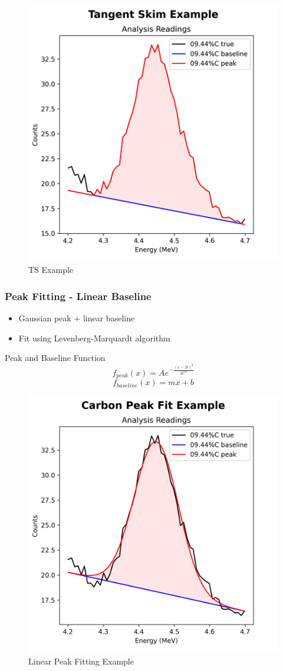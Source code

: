 \documentclass[xcolor=dvipsnames,envcountsect]{beamer}
\begin{document}
\begin{frame}
\begin{figure}
\begin{minipage}[b]{0.3\linewidth}
          \includegraphics[width=\linewidth]{Figures/tangentskimexample.png}
          \caption{TS Example}
          \label{fig:tangentskimexample}
      \end{minipage}
  \end{figure}
\end{frame}

\begin{frame}
  \frametitle{Peak Fitting - Linear Baseline}
  \begin{itemize}
    \item Gaussian peak + linear baseline
    \item Fit using Levenberg-Marquardt algorithm
  \end{itemize}
  \begin{block}{Peak and Baseline Function}
    \begin{equation}
      f_{peak}(x) = A e^{-\frac{(x - B)^2}{2C^2}}
    \end{equation}
    \begin{equation}
      f_{baseline}(x) = mx + b
    \end{equation}
  \end{block}
  \begin{figure}
      \centering
      \includegraphics[width=.2\linewidth]{Figures/CarbonPeakFitLinearBaselineExample.png}
      \caption{Linear Peak Fitting Example}
      \label{fig:peakfittingexample}
  \end{figure}
\end{frame}
\end{document}
